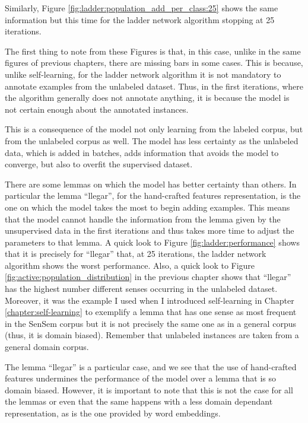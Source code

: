 Similarly, Figure \ref{fig:ladder:population_add_per_class:25} shows the same
information but this time for the ladder network algorithm stopping at 25
iterations.

The first thing to note from these Figures is that, in this case, unlike in the
same figures of previous chapters, there are missing bars in some cases. This
is because, unlike self-learning, for the ladder network algorithm it is not
mandatory to annotate examples from the unlabeled dataset. Thus, in the first
iterations, where the algorithm generally does not annotate anything, it is
because the model is not certain enough about the annotated instances.

This is a consequence of the model not only learning from the labeled corpus,
but from the unlabeled corpus as well. The model has less certainty as the
unlabeled data, which is added in batches, adds information that avoids the
model to converge, but also to overfit the supervised dataset.

There are some lemmas on which the model has better certainty than others. In
particular the lemma ``llegar'', for the hand-crafted features representation,
is the one on which the model takes the most to begin adding examples. This
means that the model cannot handle the information from the lemma given by the
unsupervised data in the first iterations and thus takes more time to adjust
the parameters to that lemma. A quick look to Figure
\ref{fig:ladder:performance} shows that it is precisely for ``llegar'' that, at
25 iterations, the ladder network algorithm shows the worst performance. Also,
a quick look to Figure \ref{fig:active:population_distribution} in the previous
chapter shows that ``llegar'' has the highest number different senses occurring
in the unlabeled dataset. Moreover, it was the example I used when I introduced
self-learning in Chapter \ref{chapter:self-learning} to exemplify a lemma that
has one sense as most frequent in the SenSem corpus but it is not precisely the
same one as in a general corpus (thus, it is domain biased). Remember that
unlabeled instances are taken from a general domain corpus.

The lemma ``llegar'' is a particular case, and we see that the use of
hand-crafted features undermines the performance of the model over a lemma that
is so domain biased. However, it is important to note that this is not the case
for all the lemmas or even that the same happens with a less domain dependant
representation, as is the one provided by word embeddings.

